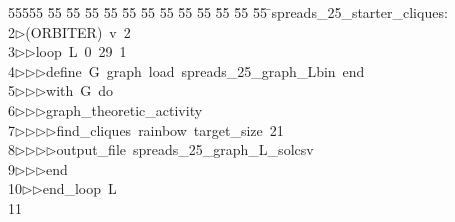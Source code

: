 %
%
\begin{tabbing}
55555 \= 55 \= 55 \= 55 \= 55 \= 55 \= 55 \= 55 \= 55 \= 55 \= 55 \= 55 \= 55 \= \>spreads\_25\_starter\_cliques:\\[0pt]
2\>$\triangleright$\>(ORBITER)\ v\ 2\ \\[0pt]
3\>$\triangleright$\>$\triangleright$\>loop\ L\ 0\ 29\ 1\ \\[0pt]
4\>$\triangleright$\>$\triangleright$\>$\triangleright$\>define\ G\ graph\ load\ spreads\_25\_graph\_Lbin\ end\ \\[0pt]
5\>$\triangleright$\>$\triangleright$\>$\triangleright$\>with\ G\ do\ \\[0pt]
6\>$\triangleright$\>$\triangleright$\>$\triangleright$\>graph\_theoretic\_activity\ \\[0pt]
7\>$\triangleright$\>$\triangleright$\>$\triangleright$\>$\triangleright$\>find\_cliques\ rainbow\ target\_size\ 21\ \\[0pt]
8\>$\triangleright$\>$\triangleright$\>$\triangleright$\>$\triangleright$\>output\_file\ spreads\_25\_graph\_L\_solcsv\ \\[0pt]
9\>$\triangleright$\>$\triangleright$\>$\triangleright$\>end\ \\[0pt]
10\>$\triangleright$\>$\triangleright$\>end\_loop\ L\\[0pt]
11\>\end{tabbing}
